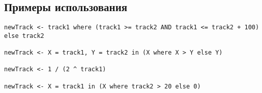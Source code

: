 \subsection*{Примеры использования}
\begin{lstlisting}
newTrack <- track1 where (track1 >= track2 AND track1 <= track2 + 100) else track2

newTrack <- X = track1, Y = track2 in (X where X > Y else Y)

newTrack <- 1 / (2 ^ track1)

newTrack <- X = track1 in (X where track2 > 20 else 0)


\end{lstlisting}


